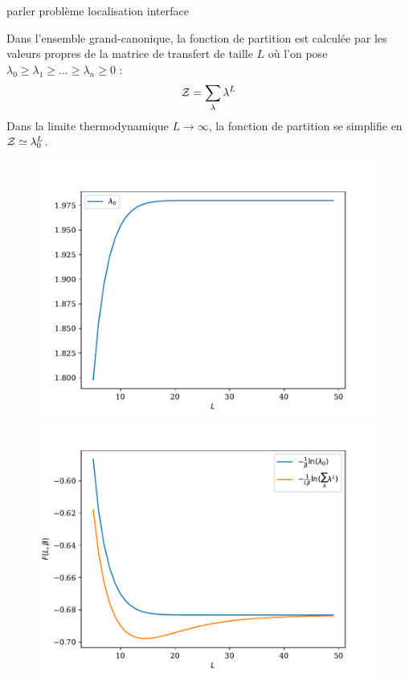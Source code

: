 parler problème localisation interface

Dans l'ensemble grand-canonique, la fonction de partition est calculée par les valeurs propres de la matrice de transfert de taille $L$ où l'on pose $\lambda_0 \ge \lambda_1 \ge ... \ge \lambda_n \ge 0$ :
\begin{align}
  \mathcal{Z} =  \sum_\lambda \lambda^L 
\end{align}
Dans la limite thermodynamique $L \to \infty$, la fonction de partition se simplifie en $\mathcal{Z} \simeq \lambda_0^L$.

\begin{figure}
	\begin{minipage}[t]{0.5\linewidth}
		\includegraphics[width=\linewidth]{chap4/freeene-lambda0-mu.pdf}
	\end{minipage}%
	\begin{minipage}[t]{0.5\linewidth}
		\includegraphics[width=\linewidth]{chap4/freeene-thermo-mu.pdf}

\end{minipage}
\end{figure}
